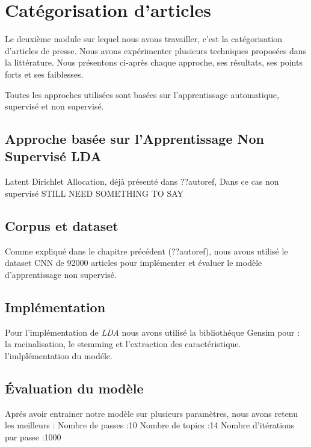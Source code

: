\section{Catégorisation d'articles}
Le deuxième module sur lequel nous avons travailler, c'est la catégorisation d'articles de presse. Nous avons expérimenter plusieurs techniques proposées dans la littérature. Nous présentons ci-après chaque approche, ses résultats, ses points forts et ses faiblesses.

Toutes les approches utilisées sont basées sur l'apprentissage automatique, supervisé et non supervisé. 
    \subsection{Approche basée sur l'Apprentissage Non Supervisé LDA}
    \textquotedbl Latent Dirichlet Allocation\textquotedbl, déjà présenté dans ??autoref{},  Dans ce cas non supervisé STILL NEED SOMETHING  TO SAY

    \subsection{Corpus et dataset}
    Comme expliqué dans le chapitre précédent (??autoref{}), nous avons utilisé le dataset CNN de 92000 articles pour implémenter et évaluer le modèle d'apprentissage non supervisé.

    \subsection{Implémentation}
    Pour l'implémentation de \emph{LDA} nous avons utilisé la bibliothéque Gensim pour :
    la racinalisation, 
    le stemming et 
    l'extraction des caractéristique. 
    l'imlplémentation du modéle. 

    \subsection{Évaluation du modèle}
    Aprés avoir entrainer notre modèle sur plusieurs paramètres, nous avons retenu les meilleurs :
    Nombre de passes :10
    Nombre de topics :14
    Nombre d'itérations par passe :1000


